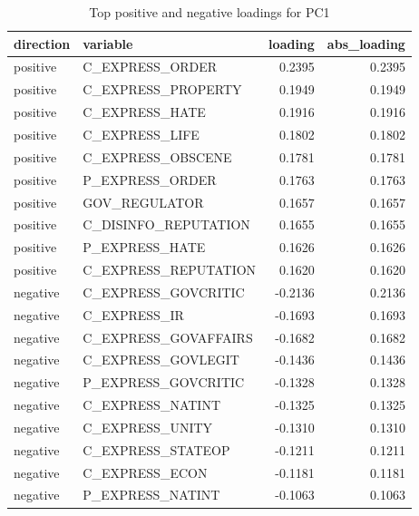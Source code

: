 \begin{table}
\caption{Top positive and negative loadings for PC1}
\label{tab:pc1_loadings}
\begin{tabular}{llrr}
\toprule
direction & variable & loading & abs_loading \\
\midrule
positive & C_EXPRESS_ORDER & 0.2395 & 0.2395 \\
positive & C_EXPRESS_PROPERTY & 0.1949 & 0.1949 \\
positive & C_EXPRESS_HATE & 0.1916 & 0.1916 \\
positive & C_EXPRESS_LIFE & 0.1802 & 0.1802 \\
positive & C_EXPRESS_OBSCENE & 0.1781 & 0.1781 \\
positive & P_EXPRESS_ORDER & 0.1763 & 0.1763 \\
positive & GOV_REGULATOR & 0.1657 & 0.1657 \\
positive & C_DISINFO_REPUTATION & 0.1655 & 0.1655 \\
positive & P_EXPRESS_HATE & 0.1626 & 0.1626 \\
positive & C_EXPRESS_REPUTATION & 0.1620 & 0.1620 \\
negative & C_EXPRESS_GOVCRITIC & -0.2136 & 0.2136 \\
negative & C_EXPRESS_IR & -0.1693 & 0.1693 \\
negative & C_EXPRESS_GOVAFFAIRS & -0.1682 & 0.1682 \\
negative & C_EXPRESS_GOVLEGIT & -0.1436 & 0.1436 \\
negative & P_EXPRESS_GOVCRITIC & -0.1328 & 0.1328 \\
negative & C_EXPRESS_NATINT & -0.1325 & 0.1325 \\
negative & C_EXPRESS_UNITY & -0.1310 & 0.1310 \\
negative & C_EXPRESS_STATEOP & -0.1211 & 0.1211 \\
negative & C_EXPRESS_ECON & -0.1181 & 0.1181 \\
negative & P_EXPRESS_NATINT & -0.1063 & 0.1063 \\
\bottomrule
\end{tabular}
\end{table}
